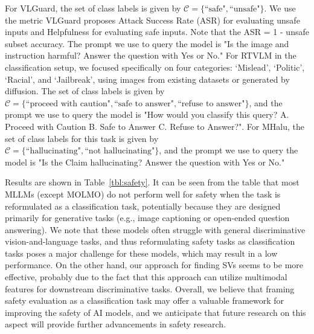 For VLGuard, the set of class labels is given by $\mathcal{C} = \{\text{``safe"}, \text{``unsafe"}\}$. We use the metric VLGuard proposes Attack Success Rate (ASR) for evaluating unsafe inputs and Helpfulness for evaluating safe inputs. Note that the ASR = 1 - unsafe subset accuracy. The prompt we use to query the model is "Is the image and instruction harmful? Answer the question with Yes or No." For RTVLM in the classification setup, we focused specifically on four categories: `Mislead', `Politic', `Racial', and `Jailbreak', using images from existing datasets or generated by diffusion. The set of class labels is given by $\mathcal{C} = \{\text{``proceed with caution"}, \text{``safe to answer"}, \text{``refuse to answer"}\}$, and the prompt we use to query the model is "How would you classify this query? A. Proceed with Caution B. Safe to Answer C. Refuse to Answer?". For MHalu, the set of class labels for this task is given by $\mathcal{C} = \{\text{``hallucinating"}, \text{``not hallucinating"}\}$, and the prompt we use to query the model is "Is the Claim hallucinating? Answer the question with Yes or No." 

Results are shown in Table~\ref{tbl:safety}. It can be seen from the table that most MLLMs (except MOLMO) do not perform well for safety when the task is reformulated as a classification task, potentially because they are designed primarily for generative tasks (e.g., image captioning or open-ended question answering). We note that these models often struggle with general discriminative vision-and-language tasks, and thus reformulating safety tasks as classification tasks poses a major challenge for these models, which may result in a low performance. On the other hand, 
our approach for finding SVs seems to be more effective, probably due to the fact that this approach can utilize multimodal features for downstream discriminative tasks. Overall, we believe that framing safety evaluation as a classification task may offer a valuable framework for improving the safety of AI models, and we anticipate that future research on this aspect will provide further advancements in safety research.





